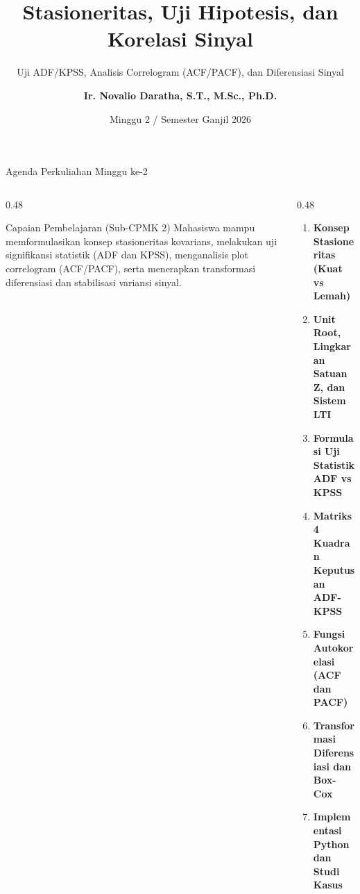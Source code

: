 \documentclass[aspectratio=169, 10pt]{beamer}
\title[\textbf{Deret Waktu (Minggu 2)}]{\textbf{Stasioneritas, Uji Hipotesis, dan Korelasi Sinyal}}
\subtitle{Uji ADF/KPSS, Analisis Correlogram (ACF/PACF), dan Diferensiasi Sinyal}
\author[\textbf{Ir. Novalio Daratha, Ph.D.}]{\textbf{Ir. Novalio Daratha, S.T., M.Sc., Ph.D.}}
\institute[FT UNIB]{Program Studi Teknik Elektro -- Fakultas Teknik\\Universitas Bengkulu}
\date{Minggu 2 / Semester Ganjil 2026}
\begin{document}
\begin{frame}[plain]
    \titlepage
\end{frame}

\begin{frame}{Agenda Perkuliahan Minggu ke-2}
    \begin{columns}[T]
        \begin{column}{0.48\textwidth}
            \begin{block}{Capaian Pembelajaran (Sub-CPMK 2)}
                Mahasiswa mampu memformulasikan konsep stasioneritas kovarians, melakukan uji signifikansi statistik (ADF dan KPSS), menganalisis plot correlogram (ACF/PACF), serta menerapkan transformasi diferensiasi dan stabilisasi variansi sinyal.
            \end{block}
        \end{column}
        \begin{column}{0.48\textwidth}
            \begin{enumerate}
                \item \textbf{Konsep Stasioneritas (Kuat vs Lemah)}
                \item \textbf{Unit Root, Lingkaran Satuan Z, dan Sistem LTI}
                \item \textbf{Formulasi Uji Statistik ADF vs KPSS}
                \item \textbf{Matriks 4 Kuadran Keputusan ADF-KPSS}
                \item \textbf{Fungsi Autokorelasi (ACF dan PACF)}
                \item \textbf{Transformasi Diferensiasi dan Box-Cox}
                \item \textbf{Implementasi Python dan Studi Kasus}
            \end{enumerate}
        \end{column}
    \end{columns}
\end{frame}
\end{document}
